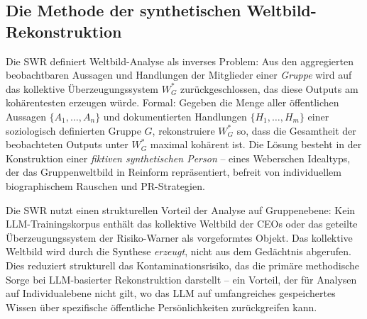 \documentclass[12pt,a4paper]{article}
\begin{document}
\subsection{Die Methode der synthetischen Weltbild-Rekonstruktion}
\label{sec:methodik:swr}

Die SWR definiert Weltbild-Analyse als inverses Problem: Aus den aggregierten beobachtbaren Aussagen und Handlungen der Mitglieder einer \emph{Gruppe} wird auf das kollektive \"Uberzeugungssystem $W_G^*$ zur\"uckgeschlossen, das diese Outputs am koh\"arentesten erzeugen w\"urde. Formal: Gegeben die Menge aller \"offentlichen Aussagen $\{A_1, \ldots, A_n\}$ und dokumentierten Handlungen $\{H_1, \ldots, H_m\}$ einer soziologisch definierten Gruppe $G$, rekonstruiere $W_G^*$ so, dass die Gesamtheit der beobachteten Outputs unter $W_G^*$ maximal koh\"arent ist. Die L\"osung besteht in der Konstruktion einer \emph{fiktiven synthetischen Person} -- eines Weberschen Idealtyps, der das Gruppenweltbild in Reinform repr\"asentiert, befreit von individuellem biographischem Rauschen und PR-Strategien.

Die SWR nutzt einen strukturellen Vorteil der Analyse auf Gruppenebene: Kein LLM-Trainingskorpus enth\"alt \glqq das kollektive Weltbild der CEOs\grqq{} oder \glqq das geteilte \"Uberzeugungssystem der Risiko-Warner\grqq{} als vorgeformtes Objekt. Das kollektive Weltbild wird durch die Synthese \emph{erzeugt}, nicht aus dem Ged\"achtnis abgerufen. Dies reduziert strukturell das Kontaminationsrisiko, das die prim\"are methodische Sorge bei LLM-basierter Rekonstruktion darstellt -- ein Vorteil, der f\"ur Analysen auf Individualebene nicht gilt, wo das LLM auf umfangreiches gespeichertes Wissen \"uber spezifische \"offentliche Pers\"onlichkeiten zur\"uckgreifen kann.
\end{document}
